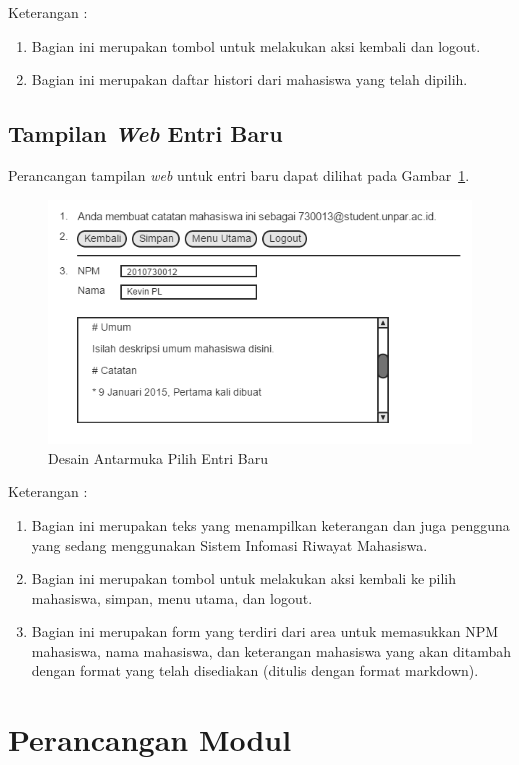 Keterangan :
\begin{enumerate}[(1)]
\item
Bagian ini merupakan tombol untuk melakukan aksi kembali dan logout.	
\item
Bagian ini merupakan daftar histori dari mahasiswa yang telah dipilih.
\end{enumerate}

\subsection{Tampilan {\it Web} Entri Baru}
Perancangan tampilan {\it web} untuk entri baru dapat dilihat pada Gambar~\ref{fig:entribaru}.
\begin{figure}[H]
\centering
\includegraphics[scale=0.5]{Gambar/entribaru.png}
\caption[Desain Antarmuka Entri Baru]{Desain Antarmuka Pilih Entri Baru}
\label{fig:entribaru}
\end{figure}

Keterangan :
\begin{enumerate}[(1)]
\item
Bagian ini merupakan teks yang menampilkan keterangan dan juga pengguna yang
sedang menggunakan Sistem Infomasi Riwayat Mahasiswa.
\item
Bagian ini merupakan tombol untuk melakukan aksi kembali ke pilih mahasiswa,
simpan, menu utama, dan logout.
\item
Bagian ini merupakan form yang terdiri dari area untuk memasukkan NPM mahasiswa,
nama mahasiswa, dan keterangan mahasiswa yang akan ditambah dengan format yang
telah disediakan (ditulis dengan format markdown).
\end{enumerate}

\section{Perancangan Modul}
\label{sec:perancanganmodul}

